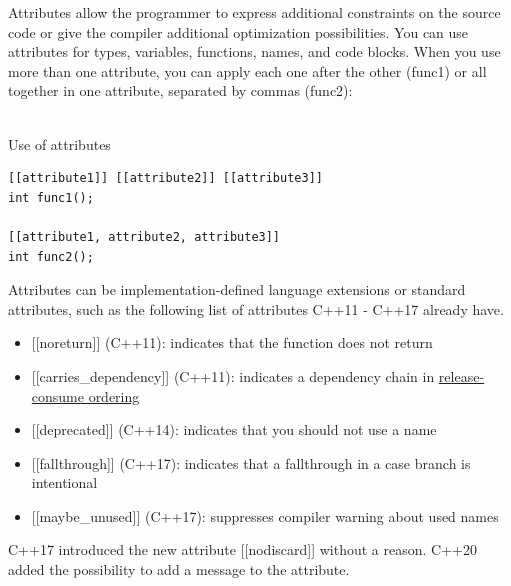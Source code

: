 \begin{tcolorbox}[breakable,enhanced jigsaw,colback=blue!5!white,colframe=blue!75!black,title={Attributes}]
Attributes allow the programmer to express additional constraints on the source code or give the compiler additional optimization possibilities. You can use attributes for types, variables, functions, names, and code blocks. When you use more than one attribute, you can apply each one after the other (func1) or all together in one attribute, separated by commas (func2):

\hspace*{\fill} \\ %
\noindent
Use of attributes
\begin{lstlisting}[style=styleCXX]
[[attribute1]] [[attribute2]] [[attribute3]]
int func1();

[[attribute1, attribute2, attribute3]]
int func2();
\end{lstlisting}

Attributes can be implementation-defined language extensions or standard attributes, such as the following list of attributes C++11 - C++17 already have.

\begin{itemize}
\item 
{}[[noreturn]] (C++11): indicates that the function does not return

\item 
{}[[carries\_dependency]] (C++11): indicates a dependency chain in \href{https://en.cppreference.com/w/cpp/atomic/memory_order#Release-Consume_ordering}{release-consume ordering}

\item 
{}[[deprecated]] (C++14): indicates that you should not use a name

\item 
{}[[fallthrough]] (C++17): indicates that a fallthrough in a case branch is intentional

\item 
{}[[maybe\_unused]] (C++17): suppresses compiler warning about used names
\end{itemize}
\end{tcolorbox}



C++17 introduced the new attribute [[nodiscard]] without a reason. C++20 added the possibility to add a message to the attribute.

